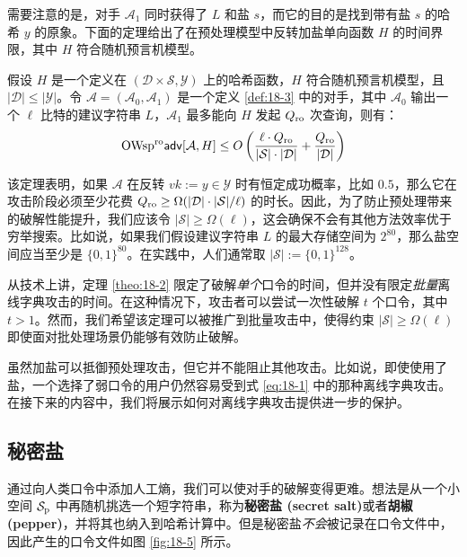 需要注意的是，对手 $\mathcal{A}_1$ 同时获得了 $L$ 和盐 $s$，而它的目的是找到带有盐 $s$ 的哈希 $y$ 的原象。下面的定理给出了在预处理模型中反转加盐单向函数 $H$ 的时间界限，其中 $H$ 符合随机预言机模型。

\begin{theorem}\label{theo:18-2}
	假设 $H$ 是一个定义在 $(\mathcal{D}\times\mathcal{S},\mathcal{Y})$ 上的哈希函数，$H$ 符合随机预言机模型，且 $|\mathcal{D}|\leq|\mathcal{Y}|$。令 $\mathcal{A}=(\mathcal{A}_0,\mathcal{A}_1)$ 是一个定义 \ref{def:18-3} 中的对手，其中 $\mathcal{A}_0$ 输出一个 $\ell$ 比特的建议字符串 $L$，$\mathcal{A}_1$ 最多能向 $H$ 发起 $Q_{\rm ro}$ 次查询，则有：
	\begin{equation}
	{\rm OWsp^{ro}\mathsf{adv}}[\mathcal{A},H]
	\leq
	O\left(\frac{\ell\cdot Q_{\rm ro}}{|\mathcal{S}|\cdot |\mathcal{D}|}+\frac{Q_{\rm ro}}{|\mathcal{D}|}\right)	
	\end{equation}
\end{theorem}

该定理表明，如果 $\mathcal{A}$ 在反转 $vk:=y\in\mathcal{Y}$ 时有恒定成功概率，比如 $0.5$，那么它在攻击阶段必须至少花费 $Q_{\rm ro}\geq\Omega({|\mathcal{D}|\cdot|\mathcal{S}|}/{\ell})$ 的时长。因此，为了防止预处理带来的破解性能提升，我们应该令 $|\mathcal{S}|\geq\Omega(\ell)$，这会确保不会有其他方法效率优于穷举搜索。比如说，如果我们假设建议字符串 $L$ 的最大存储空间为 $2^{80}$，那么盐空间应当至少是 $\{0,1\}^{80}$。在实践中，人们通常取 $|\mathcal{S}|:=\{0,1\}^{128}$。

从技术上讲，定理 \ref{theo:18-2} 限定了破解\emph{单个}口令的时间，但并没有限定\emph{批量}离线字典攻击的时间。在这种情况下，攻击者可以尝试一次性破解 $t$ 个口令，其中$t>1$。然而，我们希望该定理可以被推广到批量攻击中，使得约束 $|\mathcal{S}|\geq\Omega(\ell)$ 即使面对批处理场景仍能够有效防止破解。

\begin{snote}[加盐的局限性.]
虽然加盐可以抵御预处理攻击，但它并不能阻止其他攻击。比如说，即使使用了盐，一个选择了弱口令的用户仍然容易受到式 \ref{eq:18-1}  中的那种离线字典攻击。在接下来的内容中，我们将展示如何对离线字典攻击提供进一步的保护。
\end{snote}

\subsection{秘密盐}

通过向人类口令中添加人工熵，我们可以使对手的破解变得更难。想法是从一个小空间 $\mathcal{S}_{\rm p}$ 中再随机挑选一个短字符串，称为\textbf{秘密盐 (secret salt)}或者\textbf{胡椒 (pepper)}，并将其也纳入到哈希计算中。但是秘密盐\emph{不会}被记录在口令文件中，因此产生的口令文件如图 \ref{fig:18-5} 所示。


